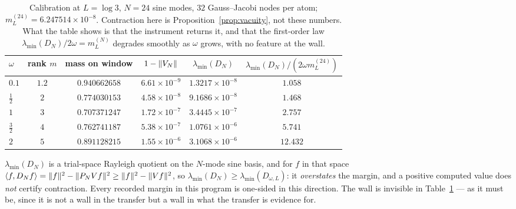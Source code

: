 \begin{table}[ht]\centering\small
\caption{Calibration at $L=\log3$, $N=24$ sine modes, $32$ Gauss--Jacobi nodes
per atom; $m_L^{(24)}=6.247514\times10^{-8}$. Contraction here is
Proposition~\ref{prop:vacuity}, not these numbers. What the table shows is that
the instrument returns it, and that the first-order law
$\lambda_{\min}(D_N)/2\omega=m_L^{(N)}$ degrades smoothly as $\omega$ grows, with
no feature at the wall.}\label{tab:calibration}
\begin{tabular}{@{}lccccc@{}}
\toprule
$\omega$ & rank $m$ & mass on window & $1-\lVert V_N\rVert$ & $\lambda_{\min}(D_N)$ & $\lambda_{\min}(D_N)/(2\omega m_L^{(24)})$\\
\midrule
$0.1$ & $1.2$ & $0.940662658$ & $6.61\times10^{-9}$ & $1.3217\times10^{-8}$ & $1.058$\\
$\frac12$ & $2$ & $0.774030153$ & $4.58\times10^{-8}$ & $9.1686\times10^{-8}$ & $1.468$\\
$1$ & $3$ & $0.707371247$ & $1.72\times10^{-7}$ & $3.4445\times10^{-7}$ & $2.757$\\
$\frac32$ & $4$ & $0.762741187$ & $5.38\times10^{-7}$ & $1.0761\times10^{-6}$ & $5.741$\\
$2$ & $5$ & $0.891128215$ & $1.55\times10^{-6}$ & $3.1068\times10^{-6}$ & $12.432$\\
\bottomrule
\end{tabular}
\end{table}

\begin{remark}\label{rem:direction}
$\lambda_{\min}(D_N)$ is a trial-space Rayleigh quotient on the $N$-mode sine
basis, and for $f$ in that space
$\langle f,D_Nf\rangle=\lVert f\rVert^2-\lVert P_NV f\rVert^2\ge\lVert f\rVert^2-\lVert Vf\rVert^2$, so
$\lambda_{\min}(D_N)\ge\lambda_{\min}(D_{\omega,L})$: it \emph{overstates} the
margin, and a positive computed value does \emph{not} certify contraction. Every
recorded margin in this program is one-sided in this direction. The wall is
invisible in Table~\ref{tab:calibration} --- as it must be, since it is not a
wall in the transfer but a wall in what the transfer is evidence for.
\end{remark}

